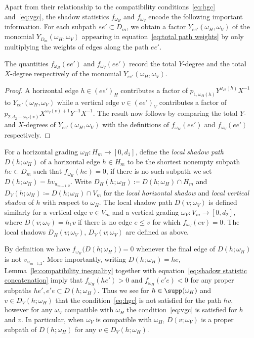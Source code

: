 Apart from their relationship to the compatibility conditions~\eqref{eq:hgc} and~\eqref{eq:vgc}, the shadow statistics $f_{\omega_H}$ and $f_{\omega_V}$ encode the following important information. 
For each subpath $ee'\subset D_m$, we obtain a factor $Y_{ee'}(\omega_H,\omega_V)$ of the monomial $Y_{D_m}(\omega_H,\omega_V)$ appearing in equation~\eqref{eq:total path weights} by only multiplying the weights of edges along the path $ee'$.
\begin{lemma}
 \label{le:shadows and degrees}
 The quantities $f_{\omega_H}(ee')$ and $f_{\omega_V}(ee')$ record the total $Y$-degree and the total $X$-degree respectively of the monomial $Y_{ee'}(\omega_H,\omega_V)$.
\end{lemma}

\begin{proof}
 A horizontal edge $h \in ( e e ' )_{ H}$ contributes a factor of $p _{ 1 , \omega_{ H}  ( h )}  Y^{ \omega_{ H}  ( h ) }X^{ - 1}$  to $Y_{ e e '} ( \omega_{ H} , \omega_{ V} )$ while a vertical edge $v\in(ee')_V$ contributes a factor of\break $p_{2,d_2-\omega_V(v)}X^{\omega_V(v)+1}Y^{-1}X^{-1}$. 
 The result now follows by comparing the total $Y$- and $X$-degrees of $Y_{ee'}(\omega_H,\omega_V)$ with the definitions of $f_{\omega_H}(ee')$ and $f_{\omega_V}(ee')$ respectively.
\end{proof}

For a horizontal grading $\omega_H:H_m\to[0,d_1]$, define the \emph{local shadow path} $D(h;\omega_H)$ of a horizontal edge $h\in H_m$ to be the shortest nonempty subpath $he\subset D_m$ such that $f_{\omega_H}(he)=0$, if there is no such subpath we set $D(h;\omega_H)=hv_{u_{m-1,2}}$. 
Write $D_H(h;\omega_H)\coloneqq D(h;\omega_H)\cap H_m$ and $D_V(h;\omega_H)\coloneqq D(h;\omega_H)\cap V_m$ for the \emph{local horizontal shadow} and \emph{local vertical shadow} of $h$ with respect to $\omega_H$. 
The local shadow path $D(v;\omega_V)$ is defined similarly for a vertical edge $v\in V_m$ and a vertical grading $\omega_V:V_m\to[0,d_2]$, where $D(v;\omega_V)=h_1v$ if there is no edge $e\le v$ for which $f_{\omega_V}(ev)=0$.
The local shadows $D_H(v;\omega_V)$, $D_V(v;\omega_V)$ are defined as above. 

By definition we have $f_{\omega_H}\big(D(h;\omega_H)\big)=0$ whenever the final edge of $D(h;\omega_H)$ is not $v_{u_{m-1,2}}$. 
More importantly, writing $D(h;\omega_H)=he$, Lemma~\ref{le:compatibility inequality} together with equation~\eqref{eq:shadow statistic concatenation} imply that $f_{\omega_H}(he')>0$ and $f_{\omega_H}(e'e)<0$ for any proper subpaths $he',e'e\subset D(h;\omega_H)$. 
Thus we see for $h\in\supp(\omega_H)$ and $v\in D_V(h;\omega_H)$ that the condition~\eqref{eq:hgc} is not satisfied for the path $hv$, however for any $\omega_V$ compatible with $\omega_H$ the condition~\eqref{eq:vgc} is satisfied for $h$ and $v$. 
In particular, when $\omega_V$ is compatible with $\omega_H$, $D(v;\omega_V)$ is a proper subpath of $D(h;\omega_H)$ for any $v\in D_V(h;\omega_H)$.

